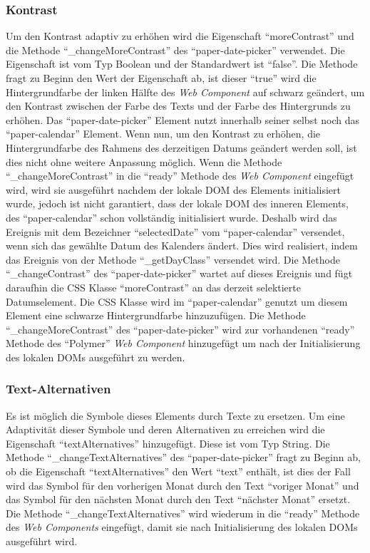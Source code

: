\documentclass[12pt, paper=a4, bibtotoc, toc=listof, headsepline=true]{scrreprt}
\begin{document}
		\subsubsection{Kontrast}
		Um den Kontrast adaptiv zu erhöhen wird die Eigenschaft \enquote{moreContrast} und die Methode \enquote{\_changeMoreContrast} des \enquote{paper-date-picker} verwendet. Die Eigenschaft ist vom Typ Boolean und der Standardwert ist \enquote{false}. Die Methode fragt zu Beginn den Wert der Eigenschaft ab, ist dieser \enquote{true} wird die Hintergrundfarbe der linken Hälfte des \emph{Web Component} auf schwarz geändert, um den Kontrast zwischen der Farbe des Texts und der Farbe des Hintergrunds zu erhöhen. Das \enquote{paper-date-picker} Element nutzt innerhalb seiner selbst noch das \enquote{paper-calendar} Element. Wenn nun, um den Kontrast zu erhöhen, die Hintergrundfarbe des Rahmens des derzeitigen Datums geändert werden soll, ist dies nicht ohne weitere Anpassung möglich. Wenn die Methode \enquote{\_changeMoreContrast} in die \enquote{ready} Methode des \emph{Web Component} eingefügt wird, wird sie ausgeführt nachdem der lokale \ac{DOM} des Elements initialisiert wurde, jedoch ist nicht garantiert, dass der lokale \ac{DOM} des inneren Elements, des \enquote{paper-calendar} schon vollständig initialisiert wurde. Deshalb wird das Ereignis mit dem Bezeichner \enquote{selectedDate} vom \enquote{paper-calendar} versendet, wenn sich das gewählte Datum des Kalenders ändert. Dies wird realisiert, indem das Ereignis von der Methode \enquote{\_getDayClass} versendet wird. Die Methode \enquote{\_changeContrast} des \enquote{paper-date-picker} wartet auf dieses Ereignis und fügt daraufhin die \ac{CSS} Klasse \enquote{moreContrast} an das derzeit selektierte Datumselement. Die \ac{CSS} Klasse wird im \enquote{paper-calendar} genutzt um diesem Element eine schwarze Hintergrundfarbe hinzuzufügen. Die Methode \enquote{\_changeMoreContrast} des \enquote{paper-date-picker} wird zur vorhandenen \enquote{ready} Methode des \enquote{Polymer} \emph{Web Component} hinzugefügt um nach der Initialisierung des lokalen \ac{DOM}s ausgeführt zu werden.
		\subsubsection{Text-Alternativen}
		Es ist möglich die Symbole dieses Elements durch Texte zu ersetzen. Um eine Adaptivität dieser Symbole und deren Alternativen zu erreichen wird die Eigenschaft \enquote{textAlternatives} hinzugefügt. Diese ist vom Typ String. Die Methode \enquote{\_changeTextAlternatives} des \enquote{paper-date-picker} fragt zu Beginn ab, ob die Eigenschaft \enquote{textAlternatives} den Wert \enquote{text} enthält, ist dies der Fall wird das Symbol für den vorherigen Monat durch den Text \enquote{voriger Monat} und das Symbol für den nächsten Monat durch den Text \enquote{nächster Monat} ersetzt. Die Methode \enquote{\_changeTextAlternatives} wird wiederum in die \enquote{ready} Methode des \emph{Web Components} eingefügt, damit sie nach Initialisierung des lokalen \ac{DOM}s ausgeführt wird. 
\end{document}
